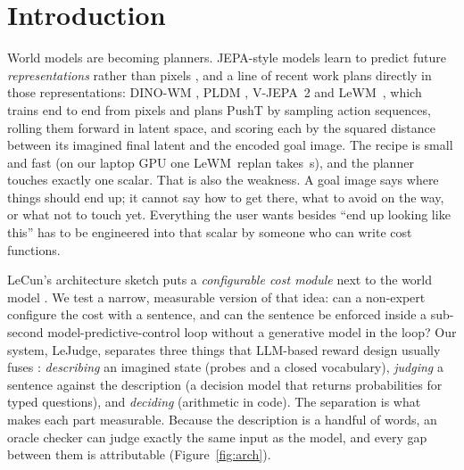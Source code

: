 \documentclass[11pt]{article}
\newcommand{\lejudge}{LeJudge}
\newcommand{\lewm}{LeWM}
\begin{document}
\section{Introduction}
World models are becoming planners. JEPA-style models learn to predict future \emph{representations} rather than pixels \citep{lecun2022path,assran2023ijepa}, and a line of recent work plans directly in those representations: DINO-WM \citep{zhou2024dinowm}, PLDM \citep{sobal2025pldm}, V-JEPA~2 \citep{assran2025vjepa2} and \lewm\ \citep{maes2026lewm}, which trains end to end from pixels and plans PushT by sampling action sequences, rolling them forward in latent space, and scoring each by the squared distance between its imagined final latent and the encoded goal image. The recipe is small and fast (on our laptop GPU one \lewm\ replan takes \,s), and the planner touches exactly one scalar. That is also the weakness. A goal image says where things should end up; it cannot say how to get there, what to avoid on the way, or what not to touch yet. Everything the user wants besides ``end up looking like this'' has to be engineered into that scalar by someone who can write cost functions.

LeCun's architecture sketch puts a \emph{configurable cost module} next to the world model \citep{lecun2022path}. We test a narrow, measurable version of that idea: can a non-expert configure the cost with a sentence, and can the sentence be enforced inside a sub-second model-predictive-control loop without a generative model in the loop? Our system, \lejudge, separates three things that LLM-based reward design usually fuses \citep{ma2024eureka,rocamonde2024vlmrm,yu2023l2r}: \emph{describing} an imagined state (probes and a closed vocabulary), \emph{judging} a sentence against the description (a decision model that returns probabilities for typed questions), and \emph{deciding} (arithmetic in code). The separation is what makes each part measurable. Because the description is a handful of words, an oracle checker can judge exactly the same input as the model, and every gap between them is attributable (Figure~\ref{fig:arch}).
\end{document}
